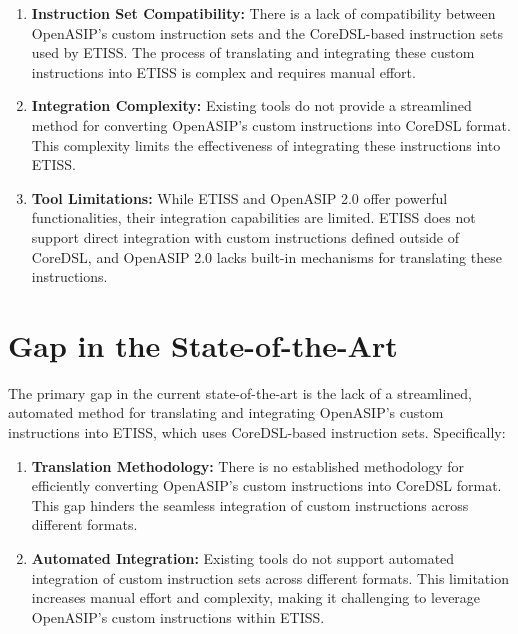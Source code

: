 \begin{enumerate}

    \item \textbf{Instruction Set Compatibility:}
    There is a lack of compatibility between OpenASIP's custom instruction sets and the CoreDSL-based instruction sets used by ETISS.
    The process of translating and integrating these custom instructions into ETISS is complex and requires manual effort.

    \item \textbf{Integration Complexity:}
    Existing tools do not provide a streamlined method for converting OpenASIP's custom instructions into CoreDSL format.
    This complexity limits the effectiveness of integrating these instructions into ETISS.

    \item \textbf{Tool Limitations:}
    While ETISS and OpenASIP 2.0 offer powerful functionalities, their integration capabilities are limited.
    ETISS does not support direct integration with custom instructions defined outside of CoreDSL, and OpenASIP 2.0 lacks built-in mechanisms for translating these instructions.

\end{enumerate}

\section{Gap in the State-of-the-Art}

The primary gap in the current state-of-the-art is the lack of a streamlined, automated method for translating and integrating OpenASIP's custom instructions into ETISS,
which uses CoreDSL-based instruction sets. Specifically:

\begin{enumerate}

    \item \textbf{Translation Methodology:}
    There is no established methodology for efficiently converting OpenASIP's custom instructions into CoreDSL format.
    This gap hinders the seamless integration of custom instructions across different formats.

    \item \textbf{Automated Integration:}
    Existing tools do not support automated integration of custom instruction sets across different formats.
    This limitation increases manual effort and complexity, making it challenging to leverage OpenASIP's custom instructions within ETISS.

\end{enumerate}

